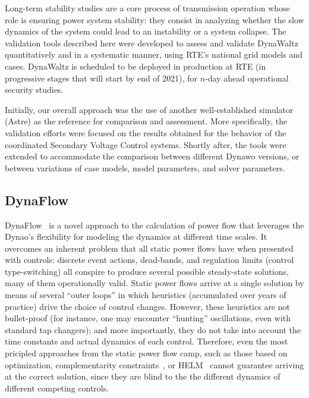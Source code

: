 \documentclass[conference]{IEEEtran}
\newcommand{\Dynawo}{Dyna\textomega o} %
\begin{document}
Long-term stability studies are a core process of transmission operation whose
role is ensuring power system stability: they consist in analyzing whether the
slow dynamics of the system could lead to an instability or a system
collapse. The validation tools described here were developed to assess and
validate DynaWaltz quantitatively and in a systematic manner, using RTE's
national grid models and cases. DynaWaltz is scheduled to be deployed in
production at RTE (in progressive stages that will start by end of 2021), for
$n$-day ahead operational security studies.

Initially, our overall approach was the use of another well-established
simulator (Astre) as the reference for comparison and assessment. More
specifically, the validation efforts were focused on the results obtained for
the behavior of the coordinated Secondary Voltage Control systems. Shortly
after, the tools were extended to accommodate the comparison between different
Dynawo versions, or between variations of case models, model parameters, and
solver parameters.



\subsection{DynaFlow}

DynaFlow~\cite{Cossart21} is a novel approach to the calculation of power flow
that leverages the \Dynawo's flexibility for modeling the dynamics at different
time scales. It overcomes an inherent problem that all static power flows have
when presented with controls: discrete event actions, dead-bands, and regulation
limits (control type-switching) all conspire to produce several possible
steady-state solutions, many of them operationally valid.  Static power flows
arrive at a single solution by means of several ``outer loops'' in which
heuristics (accumulated over years of practice) drive the choice of control
changes. However, these heuristics are not bullet-proof (for instance, one may
encounter ``hunting'' oscillations, even with standard tap changers); and more
importantly, they do not take into account the time constants and actual
dynamics of each control. Therefore, even the most pricipled approaches from the
static power flow camp, such as those based on optimization\cite{Ju20},
complementarity constraints~\cite{Murray15}, or HELM~\cite{Trias18} cannot
guarantee arriving at the correct solution, since they are blind to the the
different dynamics of different competing controls.
\end{document}
